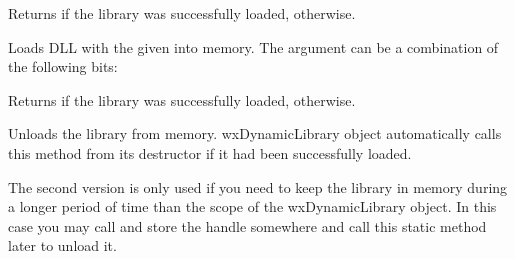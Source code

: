 

\label{wxdynamiclibraryisloaded}


Returns \true if the library was successfully loaded, \false otherwise.


\label{wxdynamiclibraryload}


Loads DLL with the given  into memory. The  argument can
be a combination of the following bits:

\begin{twocollist}
\end{twocollist}

Returns \true if the library was successfully loaded, \false otherwise.


\label{wxdynamiclibraryunload}



Unloads the library from memory. wxDynamicLibrary object automatically calls
this method from its destructor if it had been successfully loaded.

The second version is only used if you need to keep the library in memory
during a longer period of time than the scope of the wxDynamicLibrary object.
In this case you may call  and store
the handle somewhere and call this static method later to unload it.

